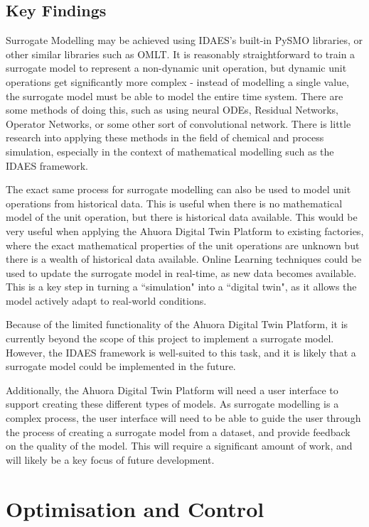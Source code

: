 \documentclass[12pt]{report}
\begin{document}
\subsection{Key Findings}

Surrogate Modelling may be achieved using IDAES's built-in PySMO libraries, or other similar libraries such as OMLT. It is reasonably straightforward to train a surrogate model to represent a non-dynamic unit operation, but dynamic unit operations get significantly more complex - instead of modelling a single value, the surrogate model must be able to model the entire time system. There are some methods of doing this, such as using neural ODEs, Residual Networks, Operator Networks, or some other sort of convolutional network. There is little research into applying these methods in the field of chemical and process simulation, especially in the context of mathematical modelling such as the IDAES framework.

The exact same process for surrogate modelling can also be used to model unit operations from historical data. This is useful when there is no mathematical model of the unit operation, but there is historical data available. This would be very useful when applying the Ahuora Digital Twin Platform to existing factories, where the exact mathematical properties of the unit operations are unknown but there is a wealth of historical data available. Online Learning techniques could be used to update the surrogate model in real-time, as new data becomes available. This is a key step in turning a ``simulation" into a ``digital twin", as it allows the model actively adapt to real-world conditions.

Because of the limited functionality of the Ahuora Digital Twin Platform, it is currently beyond the scope of this project to implement a surrogate model. However, the IDAES framework is well-suited to this task, and it is likely that a surrogate model could be implemented in the future.

Additionally, the Ahuora Digital Twin Platform will need a user interface to support creating these different types of models. As surrogate modelling is a complex process, the user interface will need to be able to guide the user through the process of creating a surrogate model from a dataset, and provide feedback on the quality of the model. This will require a significant amount of work, and will likely be a key focus of future development.


\section{Optimisation and Control}
\end{document}
